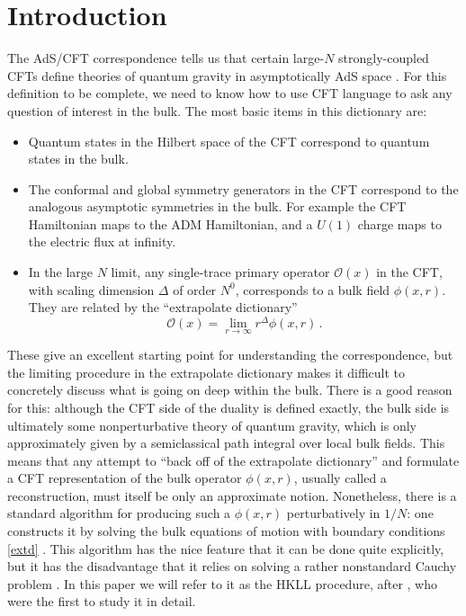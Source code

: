 \documentclass[aps,prl,twocolumn,nofootinbib,longbibliography,superscriptaddress]{revtex4-1}
\newcommand{\be}{\begin{equation}}
\newcommand{\ee}{\end{equation}}
\newcommand{\bi}{\begin{itemize}}
\newcommand{\ei}{\end{itemize}}
\newcommand{\mO}{\mathcal{O}}
\begin{document}
\section{Introduction}
The AdS/CFT correspondence tells us that
certain
large-$N$ strongly-coupled CFTs define theories of quantum gravity in asymptotically AdS space \cite{Maldacena:1997re,Gubser:1998bc,Witten:1998qj,Banks:1998dd,Aharony:1999ti,Heemskerk:2009pn}.  For this definition to be complete, we need to know how to use CFT language to ask any question of interest in the bulk.  The most basic items in this dictionary are:
\bi
\item Quantum states in the Hilbert space of the CFT correspond to quantum states in the bulk.
\item The conformal and global symmetry generators in the CFT correspond to the analogous asymptotic symmetries in the bulk.  For example the CFT Hamiltonian maps to the ADM Hamiltonian, and a $U(1)$ charge maps to the electric flux at infinity.
\item  In the large $N$ limit, any single-trace primary operator $\mO(x)$ in the CFT, with scaling dimension $\Delta$ of order $N^0$, corresponds to a bulk field $\phi(x,r)$.  They are related by the ``extrapolate dictionary'' \cite{Banks:1998dd,Balasubramanian:1998de,Harlow:2011ke}
\be\label{extd}
\mO(x)=\lim_{r\to\infty} r^{\Delta}\phi(x,r) \,.
\ee
\ei
These give an excellent starting point for understanding the correspondence, but the limiting procedure in the extrapolate dictionary makes it difficult to concretely discuss what is going on deep within the bulk.  There is a good reason for this: although the CFT side of the duality is defined exactly, the bulk side is ultimately some nonperturbative theory of quantum gravity, which is only approximately given by a semiclassical path integral over local bulk fields.  This means that any attempt to ``back off of the extrapolate dictionary'' and formulate a CFT representation of the bulk operator $\phi(x,r)$, usually called a reconstruction, must itself be only an approximate notion.  Nonetheless, there is a standard algorithm for producing such a $\phi(x,r)$ perturbatively in $1/N$: one constructs it by solving the bulk equations of motion with boundary conditions \eqref{extd} \cite{Banks:1998dd,Hamilton:2006az,Kabat:2011rz,Heemskerk:2012mn,Kabat:2012hp,Heemskerk:2012np,Morrison:2014jha}.  This algorithm has the nice feature that it can be done quite explicitly, but it has the disadvantage that it relies on solving a rather nonstandard Cauchy problem \cite{Bousso:2012mh,Heemskerk:2012mn}.  In this paper we will refer to it as the HKLL procedure, after \cite{Hamilton:2006az}, who were the first to study it in detail.
\end{document}
